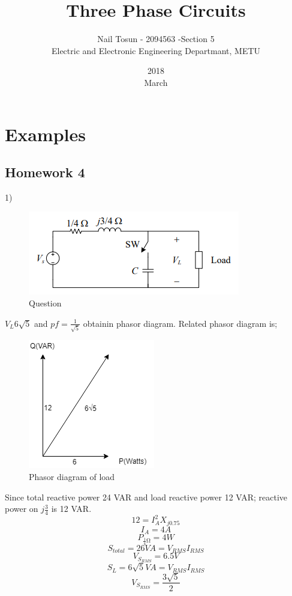 \documentclass[11pt]{article}
\title{Three Phase Circuits}
\date{2018\\ March}
\author{Nail Tosun - 2094563 -Section 5\\ Electric and Electronic Engineering Departmant, METU}
\begin{document}
\maketitle
\section*{Examples}
\subsection*{Homework 4}

1)

\begin{figure}[H]
  \includegraphics[scale=1, center]{hw5q1}
  \caption{Question}
  \label{fig:zero}
\end{figure}
$V_{L}6\sqrt{5}$ and $pf=\frac{1}{\sqrt{5}}$ obtainin phasor diagram. Related phasor diagram is;
\begin{figure}[H]
  \includegraphics[scale=0.6, center]{phasor1}
  \caption{Phasor diagram of load}
  \label{fig:zero}
\end{figure}
  Since total reactive power 24 VAR and load reactive power 12 VAR; reactive power on $j\frac{3}{4}$ is 12 VAR.
 \[12=I_A^2X_{j0.75}\]
 \[I_A=4A\]
 \[P_{\frac{1}{4}\si{\ohm}}=4W\]
 \[S_{total}=26VA=V_{RMS}I_{RMS}\]
 \[V_{S_{RMS}}=6.5V\]
 \[S_L=6\sqrt{5}VA=V_{RMS}I_{RMS}\]
 \[V_{S_{RMS}}=\frac{3\sqrt{5}}{2}\]
\end{document}
